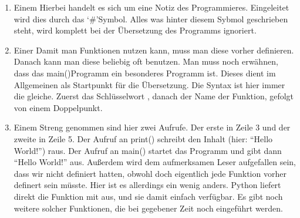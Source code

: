 \documentclass[letterpaper,10pt,english]{jupyterBook}
\begin{document}
\begin{enumerate}
%
\item {} 
\sphinxAtStartPar
Einem  Hierbei handelt es sich um eine Notiz des Programmieres. Eingeleitet wird dies durch das ‘\#’\sphinxhyphen{}Symbol. Alles was hinter diesem Sybmol geschrieben steht, wird komplett bei der Übersetzung des Programms ignoriert.

\item {} 
\sphinxAtStartPar
Einer  Damit man Funktionen nutzen kann, muss man diese vorher definieren. Danach kann man diese beliebig oft benutzen. Man muss noch erwähnen, dass das main()\sphinxhyphen{}Programm ein besonderes Programm ist. Dieses dient im Allgemeinen als Startpunkt für die Übersetzung. Die Syntax ist hier immer die gleiche. Zuerst das Schlüsselwort , danach der Name der Funktion, gefolgt von einem Doppelpunkt.

\item {} 
\sphinxAtStartPar
Einem  Streng genommen sind hier zwei Aufrufe. Der erste in Zeile 3 und der zweite in Zeile 5. Der Aufruf an print() schreibt den Inhalt (hier: “Hello World!”) raus. Der Aufruf an main() startet das Programm und gibt dann “Hello World!” aus. Außerdem wird dem aufmerksamen Leser aufgefallen sein, dass wir  nicht definiert hatten, obwohl doch eigentlich jede Funktion vorher definert sein müsste. Hier ist es allerdings ein wenig anders. Python liefert direkt die \sphinxhyphen{}Funktion mit aus, und sie damit einfach verfügbar. Es gibt noch weitere solcher Funktionen, die bei gegebener Zeit noch eingeführt werden.

\end{enumerate}
\end{document}
